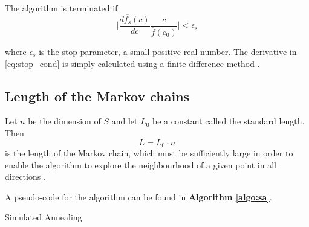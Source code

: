 The algorithm is terminated if:
\begin{equation}
\label{eq:stop_cond}
    \Bigg|\frac{d \overline{f_s}(c)}{dc} \frac{c}{\overline{f}(c_0)} \Bigg| < \epsilon_s 
\end{equation}

where $\epsilon_s$ is the stop parameter, a small positive real number. The derivative in \cref{eq:stop_cond}
is simply calculated using a finite difference method \cite{dekkers}.
 

\subsection{Length of the Markov chains}
Let $n$ be the dimension of $S$ and let $L_0$ be a constant called the standard length. Then 
\begin{equation}
    L=L_0 \cdot n     
\end{equation}
is the length of the Markov chain, which must be sufficiently large in order to enable the algorithm to explore the neighbourhood of a given point in all directions \cite{dekkers}. \vspace{5pt}

A pseudo-code for the algorithm can be found in \textbf{Algorithm \ref{algo:sa}}.


\begin{algorithm}
\caption{Simulated Annealing}\label{algo:sa}
\vspace{8pt}
\nosemic
\SetAlgoLined
{}

\end{algorithm}

